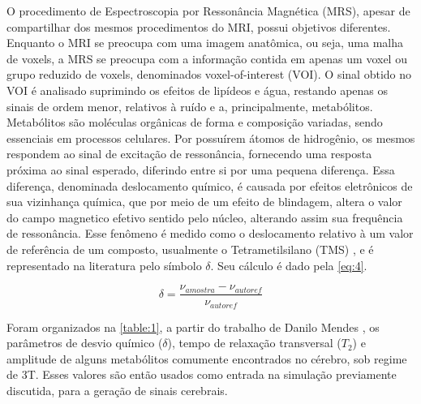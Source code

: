 \documentclass[
12pt,		
twoside, 
a4paper,
chapter=TITLE,
english,			
brazil]{USPSC-classe/USPSC}
\begin{document}
O procedimento de Espectroscopia por Ressonância Magnética (MRS), apesar de compartilhar dos mesmos procedimentos do MRI, possui objetivos 
diferentes. Enquanto o MRI se preocupa com uma imagem anatômica, ou seja, uma malha de voxels, a MRS se preocupa com a informação contida em apenas um voxel ou grupo 
reduzido de voxels, denominados voxel-of-interest (VOI). O sinal obtido no VOI é analisado suprimindo os efeitos de lipídeos e água, restando 
apenas os sinais de ordem menor, relativos à ruído e a, principalmente, metabólitos. Metabólitos são moléculas orgânicas de forma e composição 
variadas, sendo essenciais em processos celulares. Por possuírem átomos de hidrogênio, os mesmos respondem ao sinal de excitação 
de ressonância, fornecendo uma resposta próxima ao sinal esperado, diferindo entre si por uma pequena diferença. Essa diferença, denominada deslocamento químico, 
é causada por efeitos eletrônicos de sua vizinhança química, que por meio de um efeito de blindagem, altera o valor do campo magnetico efetivo sentido pelo núcleo, 
alterando assim sua frequência de ressonância. Esse fenômeno é medido como o deslocamento relativo à um valor de referência de um composto, usualmente o 
Tetrametilsilano (TMS) \cite{}, e é representado na literatura pelo símbolo $\delta$. Seu cálculo é dado pela \autoref{eq:4}.

\begin{equation} \label{eq:4}
    \delta = \frac{\nu _{amostra} - \nu _{autoref}}{\nu _{autoref}}
\end{equation}


Foram organizados na \autoref{table:1}, a partir do trabalho de Danilo Mendes \cite{Silva2020-io}, os parâmetros de desvio químico ($\delta$), tempo de relaxação 
transversal ($T_2$) e amplitude de alguns metabólitos comumente encontrados no cérebro, sob regime de 3T. Esses valores são então usados como entrada na simulação
previamente discutida, para a geração de sinais cerebrais. 
\end{document}
